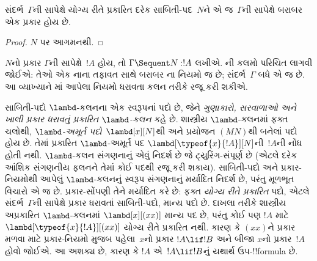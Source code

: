 \documentclass[../../../include/open-logic-section]{subfiles}
\begin{document}
\begin{prop}
સંદર્ભ~$\Gamma$ની સાપેક્ષે યોગ્ય રીતે પ્રકારિત
દરેક સાબિતી-પદ~$N$ને એ જ~$\Gamma$ની સાપેક્ષે
બરાબર એક પ્રકાર હોય છે.
\end{prop}

\begin{proof}
  $N$ પર આગમનથી.
\end{proof}

$N$નો પ્રકાર $\Gamma$ની સાપેક્ષે~$!A$ હોય,
તો $\Gamma \Sequent N : !A$ લખીએ.
ની કલમો પરિચિત લાગવી જોઈએ:
તેઓ એક નાના તફાવત સાથે બરાબર ના નિયમો જ છે;
સંદર્ભ~$\Gamma$ બધે એ જ છે.
આ વ્યાખ્યાને માં આપેલા નિયમો ધરાવતા
 કલન તરીકે રજૂ કરી શકીએ.



સાબિતી-પદો $\lambd$-કલનના એક સ્વરૂપનાં પદો છે,
જેને \emph{ગુણાકારો, સરવાળાઓ અને ખાલી પ્રકાર ધરાવતું
પ્રકારિત $\lambd$-કલન} કહે છે.
શાસ્ત્રીય $\lambd$-કલનમાં ફક્ત ચલોથી,
\emph{$\lambd$-અમૂર્ત પદો}~$\lambd[x][N]$થી
અને પ્રયોજન $(MN)$થી બનેલાં પદો હોય છે.
તેમાં પ્રકારિત $\lambd$-અમૂર્ત પદ
$\lambd[\typeof{x}{!A}][N]$ની~$!A$ની નોંધ હોતી નથી.
$\lambd$-કલન સંગણનાનું એવું નિદર્શ છે જે ટ્યુરિંગ-સંપૂર્ણ છે
(એટલે દરેક આંશિક સંગણનીય ફલનને તેમાં કોઈ પદથી રજૂ કરી શકાય).
સાબિતી-પદો અને પ્રકાર-નિયમોથી આપેલું $\lambd$-કલનનું સ્વરૂપ
સંગણનાનું મર્યાદિત નિદર્શ છે, પરંતુ મૂળભૂત વિચારો એ જ છે.
પ્રકાર-સોંપણી તેને મર્યાદિત કરે છે:
ફક્ત \emph{યોગ્ય રીતે પ્રકારિત} પદો,
એટલે સંદર્ભ~$\Gamma$ની સાપેક્ષે પ્રકાર ધરાવતાં સાબિતી-પદો,
માન્ય પદો છે.
દાખલા તરીકે શાસ્ત્રીય અપ્રકારિત $\lambd$-કલનમાં
$\lambd[x][(xx)]$ માન્ય પદ છે, પરંતુ
કોઈ પણ $!A$ માટે $\lambd[\typeof{x}{!A}][(xx)]$
યોગ્ય રીતે પ્રકારિત નથી.
કારણ કે $(xx)$ને પ્રકાર મળવા માટે પ્રકાર-નિયમો મુજબ
પહેલા~$x$નો પ્રકાર $!A \lif !B$
અને બીજા $x$નો પ્રકાર~$!A$ હોવો જોઈએ.
આ અશક્ય છે, કારણ કે $!A$ એ~$!A \lif !B$નું
યથાર્થ ઉપ-!!{formula} છે.
\end{document}

